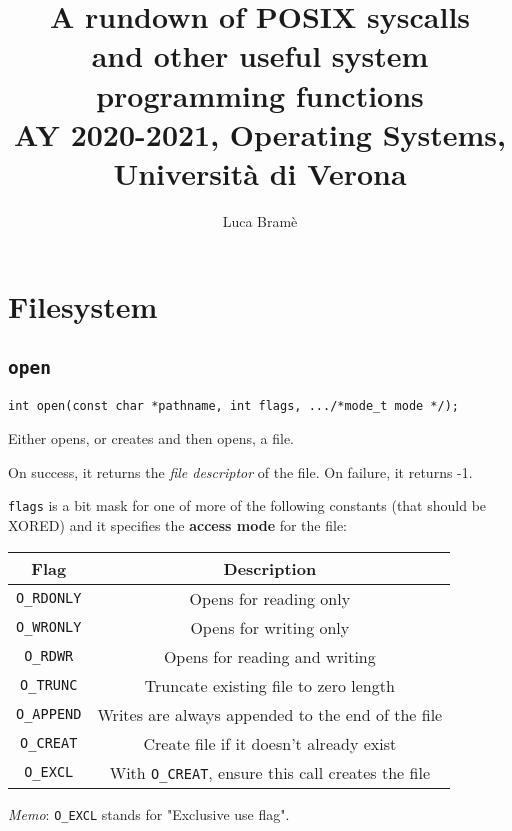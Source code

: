 \documentclass{article}
\title{A rundown of POSIX syscalls \\
\large and other useful system programming functions \\
AY 2020-2021, Operating Systems, Università di Verona}
\author{Luca Bramè}
\date{}
\begin{document}
\maketitle

\tableofcontents
\newpage

\section{Filesystem}

\subsection{\texttt{open}}

\begin{verbatim}
int open(const char *pathname, int flags, .../*mode_t mode */);
\end{verbatim}

Either opens, or creates and then opens, a file.

On success, it returns the \textit{file descriptor} of the file. On failure, it returns -1.

\texttt{flags} is a bit mask for one of more of the following constants (that should be XORED) and it specifies the \textbf{access mode} for the file:

\begin{center}
\begin{tabular}{ |c|c| }
    \hline \textbf{Flag} & \textbf{Description} \\
    \hline
    \texttt{O\_RDONLY} & Opens for reading only \\
    \texttt{O\_WRONLY} & Opens for writing only \\
    \texttt{O\_RDWR} & Opens for reading and writing \\
    \hline
    \texttt{O\_TRUNC} & Truncate existing file to zero length \\
    \texttt{O\_APPEND} & Writes are always appended to the end of the file \\
    \hline
    \texttt{O\_CREAT} & Create file if it doesn't already exist \\
    \texttt{O\_EXCL} & With \texttt{O\_CREAT}, ensure this call creates the file \\
    \hline 
\end{tabular}
\end{center}

\textit{Memo}: \texttt{O\_EXCL} stands for "Exclusive use flag".
\end{document}
